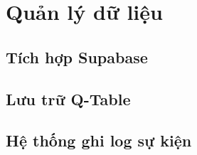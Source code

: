 \chapter{Quản lý dữ liệu}
\section{Tích hợp Supabase}
\section{Lưu trữ Q-Table}
\section{Hệ thống ghi log sự kiện}